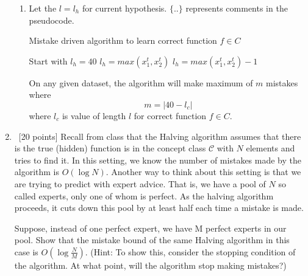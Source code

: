 \begin{enumerate}
\begin{enumerate}
		\item 
		Let the $l = l_h$ for current hypothesis. $\{ .. \}$ represents comments in the pseudocode.\\
		\begin{algorithm}
			\caption{Mistake driven algorithm to learn correct function $f \in C$}
			\begin{algorithmic}
				\STATE Start with $l_h = 40$ 
							\STATE $l_h = max(x_1^t, x_2^t)$ 
						\ELSE
							\STATE $l_h = max(x_1^t, x_2^t) - 1$ 
						\ENDIF				
					\ENDIF 
				\ENDFOR
			\end{algorithmic}	
		\end{algorithm}
	
	On any given dataset, the algorithm will make maximum of $m$ mistakes where $$m = |40 - l_c|$$ where $l_c$ is value of length $l$ for correct function $f \in C$.
	
	
	
	
	
	
	\end{enumerate}	    
    
     	
    
    
    

    \item~[20 points] Recall from class that the Halving algorithm assumes that there is the true (hidden) function is in the concept class $\mathcal{C}$ with $N$ elements and tries to find it. In this setting, we know the number of mistakes made by the algorithm is $O(\log N)$.
        Another way to think about this setting is that we are trying to predict with expert advice. That is, we have a pool of $N$ so called experts, only one of whom is perfect. As the halving algorithm proceeds, it cuts down this pool by at least half each time a mistake is made.

        Suppose, instead of one perfect expert, we have M perfect experts in our pool. Show that the mistake bound of the same Halving algorithm in this case is $O(\log\frac{N}{M})$.
        (Hint: To show this, consider the stopping condition of the algorithm. At what point, will the algorithm stop making mistakes?)
\end{enumerate}

